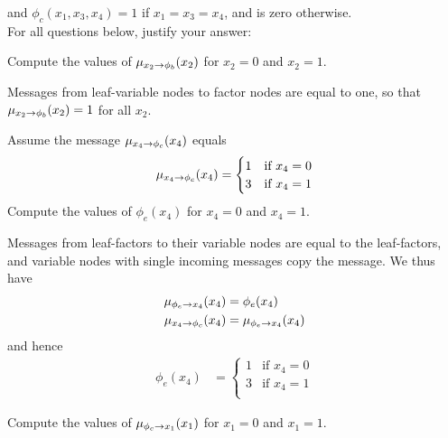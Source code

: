   and $\phi_c(x_1,x_3,x_4) = 1$ if $x_1=x_3=x_4$, and is zero otherwise.\\[2ex]
  For all questions below, justify your answer:
  \begin{exenumerate}
  \item Compute the values of $\xfmess{x_2}{\phi_b}{1}(x_2)$ for $x_2=0$ and $x_2=1$.

    \begin{solution}
      Messages from leaf-variable nodes to factor nodes are equal to one, so that $\xfmess{x_2}{\phi_b}{1}(x_2)=1$ for all $x_2$.
    \end{solution}

  \item Assume the message $\xfmess{x_4}{\phi_c}{1}(x_4)$ equals
    $$\xfmess{x_4}{\phi_c}{1}(x_4) = \begin{cases}
    1 & \text{if } x_4=0\\
    3 & \text{if } x_4=1\\
  \end{cases}$$
    Compute the values of $\phi_e(x_4)$ for $x_4=0$ and $x_4=1$. 

    \begin{solution}

      Messages from leaf-factors to their variable nodes are
      equal to the leaf-factors, and variable nodes with single
      incoming messages copy the message. We thus have
      \begin{align}
        \fxmess{\phi_e}{x_4}{1}(x_4) & = \phi_e(x_4)\\
        \xfmess{x_4}{\phi_c}{1}(x_4) & =  \fxmess{\phi_e}{x_4}{1}(x_4)
      \end{align}
      and hence
      \begin{align}
        \phi_e(x_4) &= \begin{cases}
          1 & \text{if } x_4=0\\
          3 & \text{if } x_4=1\\
        \end{cases}
      \end{align}
  
    \end{solution}


  \item Compute the values of $\fxmess{\phi_c}{x_1}{1}(x_1)$ for $x_1=0$ and $x_1=1$.

    \begin{solution}


\end{solution}
\end{exenumerate}
